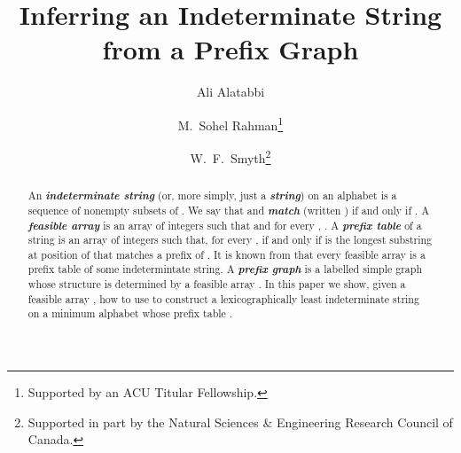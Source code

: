 \documentclass[runningheads,a4paper]{llncs}
\def\s#1{\mbox{\boldmath }}
\def\itbf#1{\textit{\textbf{#1}}}
\begin{document}
\pagestyle{headings}


\title {Inferring an Indeterminate String \\ from a Prefix Graph}
 
\author{
Ali Alatabbi
\and
M.\ Sohel Rahman\thanks{Supported by an ACU Titular Fellowship.}
\and
W.\ F.\ Smyth\thanks{Supported in part by the Natural Sciences \& Engineering
Research Council of Canada.}}




\maketitle

\begin{abstract}
An \itbf{indeterminate string} (or, more simply, just a \itbf{string})
 on an alphabet 
is a sequence of nonempty subsets of .
We say that  and  \itbf{match}
(written ) if and only if
.
A \itbf{feasible array} is an array  of integers
such that  and for every ,
.
A \itbf{prefix table} of a string  is an array 
of integers such that, for every ,
 if and only if 
is the longest substring at position  of \s{x} that matches a prefix of \s{x}.
It is known from \cite{CRSW13} that every feasible array is a prefix table of
some indetermintate string.
A \itbf{prefix graph} 
is a labelled simple graph whose structure is determined
by a feasible array \s{y}.
In this paper we show, given a feasible array \s{y},
how to use  to construct
a lexicographically least indeterminate string
on a minimum alphabet whose prefix table .
\end{abstract}
\end{document}
